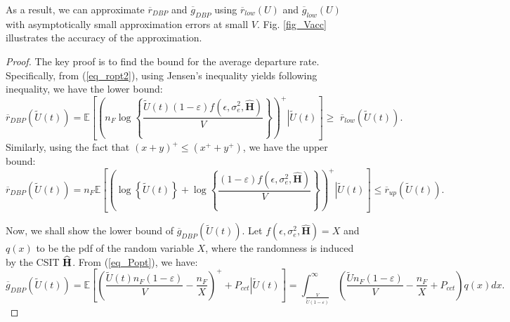 \documentclass[11pt,journal, onecolumn]{./IEEEtran}
\newcommand{\red}{\color{black}}
\begin{document}
As a result, we can approximate $\overline{r}_{DBP}$ and $\overline{g}_{DBP}$ using $\overline {r}_{low}(U)$ and $\overline{g}_{low}(U)$ with asymptotically small approximation errors at small $V$. Fig. \ref{fig_Vacc} illustrates the accuracy of the approximation.
\begin{proof} {\red The key proof is to find the bound for the average departure rate. Specifically,
from (\ref{eq_ropt2}), using Jensen's inequality yields following inequality, we have the lower bound:}
\begin{equation}\label{eq_rvct}
{\overline r _{DBP}}\left( {\widetilde U(t)} \right) = \mathbb E\left[ {{{\left( {{n_F}\log \left\{ {\frac{{\widetilde U (t)(1 - {\varepsilon})f(\epsilon,\sigma_e^2,\mathbf{\hat{H}})}}{V}} \right\}} \right)}^ + }\left| {\widetilde U(t)} \right.} \right] \ge \,\,{\overline r _{low}}\left( {\widetilde U(t)} \right).
\end{equation}
Similarly, using the fact that $(x + y)^+ \leq (x^+ + y^+)$, {\red we have the upper bound}:
\[{\overline r _{DBP}}\left( {\widetilde U(t)} \right) = {n_F}\mathbb E\left[ {{{\left( {\log \left\{ {\widetilde U(t)} \right\} + \log \left\{ {\frac{{(1 - {\varepsilon})f(\epsilon,\sigma_e^2,\mathbf{\hat{H}})}}{V}} \right\}} \right)}^ + }\left| {\widetilde U(t)} \right.} \right] \le {\overline r _{up}}(\widetilde U(t)).\]

{\red Now, we shall show the lower bound of ${\overline g _{DBP}}(\widetilde U(t))$.} Let ${f(\epsilon,\sigma_e^2,\mathbf{\hat{H}})}=X$ and $q(x)$ to be the pdf of the random variable $X$, where the randomness is induced by the CSIT $\widehat{\bf{H}}$. From (\ref{eq_Popt}), we have:
\[{\overline g _{DBP}}(\widetilde U(t)) = \mathbb E\left[ {{{\left( {\frac{{\widetilde U(t){n_F}(1 - {\varepsilon})}}{V} - \frac{{{n_F}}}{X}} \right)}^ + } + {P_{cct}}\left| {\widetilde U(t)} \right.} \right] = \int_{\frac{V}{{{{\widetilde U} }(1 - {\varepsilon})}}}^\infty  {\left( {\frac{{{{\widetilde U} }{n_F}(1 - {\varepsilon})}}{V} - \frac{{{n_F}}}{X} + {P_{cct}}} \right)} q(x)dx.\]


\end{proof}
\end{document}
